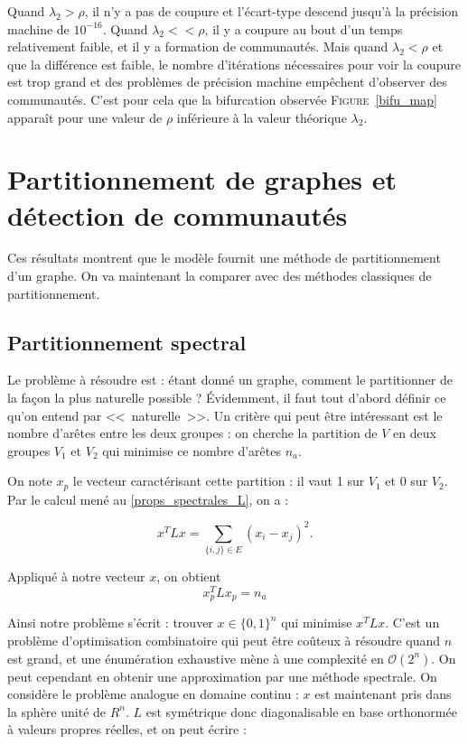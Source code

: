\documentclass[12pt]{article}
\newcommand{\fig}[1]{\textsc{Figure}~\ref{#1}}
\begin{document}
Quand $\lambda_2 > \rho$, il n'y a pas de coupure et l'écart-type
descend jusqu'à la précision machine de $10^{-16}$. Quand $\lambda_2
<< \rho$, il y a coupure au bout d'un temps relativement faible, et il
y a formation de communautés. Mais quand $\lambda_2 < \rho$ et que la
différence est faible, le nombre d'itérations nécessaires pour voir la
coupure est trop grand et des problèmes de précision machine empêchent
d'observer des communautés. C'est pour cela que la bifurcation
observée \fig{bifu_map} apparaît pour une valeur de $\rho$ inférieure
à la valeur théorique $\lambda_2$.

\section{Partitionnement de graphes et détection de communautés}
Ces résultats montrent que le modèle fournit une méthode de
partitionnement d'un graphe. On va maintenant la comparer avec des
méthodes classiques de partitionnement.

\subsection{Partitionnement spectral}
Le problème à résoudre est : étant donné un graphe, comment le
partitionner de la façon la plus naturelle possible ? Évidemment, il
faut tout d'abord définir ce qu'on entend par <<~naturelle~>>. Un
critère qui peut être intéressant est le nombre d'arêtes entre les
deux groupes : on cherche la partition de $V$ en deux groupes $V_1$ et
$V_2$ qui minimise ce nombre d'arêtes $n_a$.

On note $x_p$ le vecteur caractérisant cette partition : il vaut 1 sur
$V_1$ et 0 sur $V_2$. Par le calcul mené au \ref{props_spectrales_L},
on a :

\begin{equation}
 x^T L x = \sum_{\{i, j\} \in E} (x_i - x_j)^2.
\end{equation}

Appliqué à notre vecteur $x$, on obtient
\begin{equation}
 x_p^T L x_p = n_a
\end{equation}

Ainsi notre problème s'écrit : trouver $x \in \{0,1\}^n$ qui
minimise $x^T L x$. C'est un problème d'optimisation combinatoire
qui peut être coûteux à résoudre quand $n$ est grand, et une
énumération exhaustive mène à une complexité en $\mathcal O (2^n)$. On peut
cependant en obtenir une approximation par une méthode spectrale. On
considère le problème analogue en domaine continu : $x$ est
maintenant pris dans la sphère unité de $R^n$. $L$ est symétrique donc
diagonalisable en base orthonormée à valeurs propres réelles, et on
peut écrire :
\end{document}
